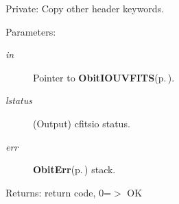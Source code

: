 Private: Copy other header keywords. 

\begin{Desc}
\item[Parameters:]
\begin{description}
\item[{\em in}]Pointer to {\bf Obit\-IOUVFITS}{\rm (p.\,\pageref{structObitIOUVFITS})}. \item[{\em lstatus}](Output) cfitsio status. \item[{\em err}]{\bf Obit\-Err}{\rm (p.\,\pageref{structObitErr})} stack. \end{description}
\end{Desc}
\begin{Desc}
\item[Returns:]return code, 0=$>$ OK \end{Desc}
